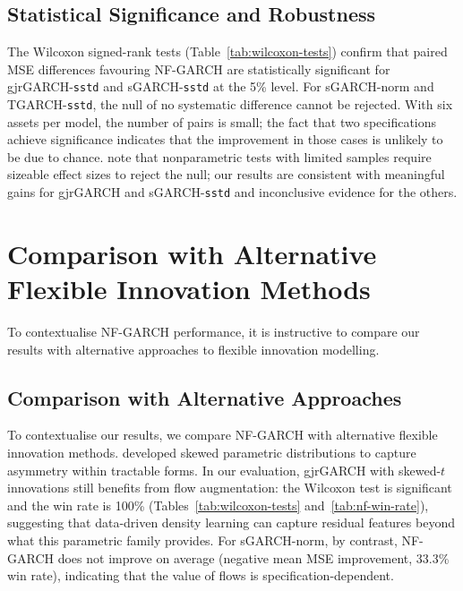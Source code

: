 \documentclass[oneside,12pt]{CUEDthesisPSnPDF}
\newcommand{\textcite}{\citet}
\newcommand{\parencite}{\citep}
\begin{document}
\subsection{Statistical Significance and Robustness}
\noindent
The Wilcoxon signed-rank tests \parencite{demvsar2006statistical} (Table~\ref{tab:wilcoxon-tests}) confirm that paired MSE differences favouring NF-GARCH are statistically significant for gjrGARCH-\texttt{sstd} and sGARCH-\texttt{sstd} at the 5\% level. For sGARCH-norm and TGARCH-\texttt{sstd}, the null of no systematic difference cannot be rejected. With six assets per model, the number of pairs is small; the fact that two specifications achieve significance indicates that the improvement in those cases is unlikely to be due to chance. \textcite{hansen2005forecast} note that nonparametric tests with limited samples require sizeable effect sizes to reject the null; our results are consistent with meaningful gains for gjrGARCH and sGARCH-\texttt{sstd} and inconclusive evidence for the others.\\

\section{Comparison with Alternative Flexible Innovation Methods}
\label{sec:disc_alternatives}

\noindent
To contextualise NF-GARCH performance, it is instructive to compare our results with alternative approaches to flexible innovation modelling.\\


\subsection{Comparison with Alternative Approaches}
\noindent
To contextualise our results, we compare NF-GARCH with alternative flexible innovation methods. \textcite{fernandez1998multivariate} developed skewed parametric distributions to capture asymmetry within tractable forms. In our evaluation, gjrGARCH with skewed-$t$ innovations still benefits from flow augmentation: the Wilcoxon test is significant and the win rate is 100\% (Tables~\ref{tab:wilcoxon-tests} and~\ref{tab:nf-win-rate}), suggesting that data-driven density learning can capture residual features beyond what this parametric family provides. For sGARCH-norm, by contrast, NF-GARCH does not improve on average (negative mean MSE improvement, 33.3\% win rate), indicating that the value of flows is specification-dependent.\\
\end{document}

